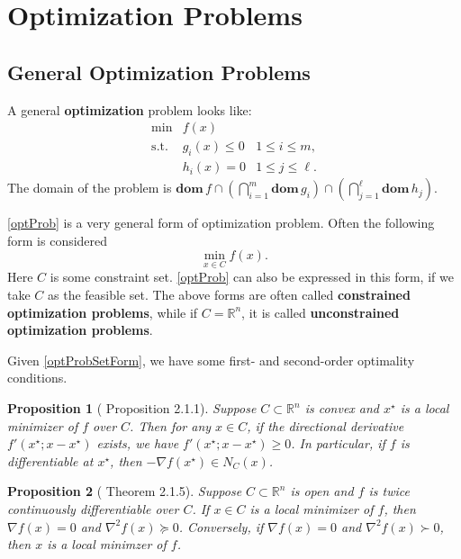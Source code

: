 \documentclass[openany]{book}
\newtheorem{proposition}{Proposition}[chapter]
\theoremstyle{definition}
\theoremstyle{remark}
\begin{document}
\section{Optimization Problems}
\subsection{General Optimization Problems}
A general \textbf{optimization} problem looks like:
\begin{equation}\label{optProb}
\begin{array}{lll}
\min & f(x) & \\
\mathrm{s.t.} & g_i(x)\le0 & 1\le i\le m, \\
 & h_i(x)=0 & 1\le j\le\ell.
\end{array}
\end{equation}
The domain of the problem is $\mathbf{dom}\,f\cap\left(\bigcap_{i=1}^m\mathbf{dom}\,g_i\right)\cap\left(\bigcap_{j=1}^{\ell}\mathbf{dom}\,h_j\right)$.

\eqref{optProb} is a very general form of optimization problem. Often the following form is considered
\begin{equation}\label{optProbSetForm}
    \min_{x\in C}f(x).
\end{equation}
Here $C$ is some constraint set. \eqref{optProb} can also be expressed in this form, if we take $C$ as the feasible set. The above forms are often called \textbf{constrained optimization problems}, while if $C=\mathbb{R}^n$, it is called \textbf{unconstrained optimization problems}.

Given \eqref{optProbSetForm}, we have some first- and second-order optimality conditions.
\begin{proposition}[\cite{BL10} Proposition 2.1.1]\label{optProbFirst}
    Suppose $C\subset \mathbb{R}^n$ is convex and $x^{\star}$ is a local minimizer of $f$ over $C$. Then for any $x\in C$, if the directional derivative $f'(x^{\star};x-x^{\star})$ exists, we have $f'(x^{\star};x-x^{\star})\ge0$. In particular, if $f$ is differentiable at $x^{\star}$, then $-\nabla f(x^{\star})\in N_C(x)$.
\end{proposition}
\begin{proposition}[\cite{BL10} Theorem 2.1.5]\label{optProbSecond}
    Suppose $C\subset \mathbb{R}^n$ is open and $f$ is twice continuously differentiable over $C$. If $x\in C$ is a local minimizer of $f$, then $\nabla f(x)=0$ and $\nabla^2f(x)\succeq0$. Conversely, if $\nabla f(x)=0$ and $\nabla^2f(x)\succ0$, then $x$ is a local minimzer of $f$.
\end{proposition}
\end{document}
